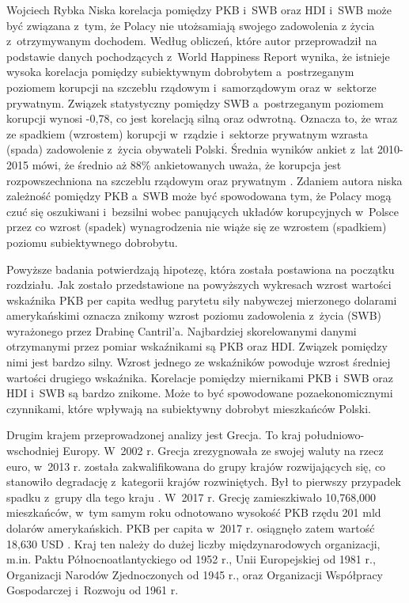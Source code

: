 \begin{artplenv}{Wojciech Rybka}
Niska korelacja pomiędzy PKB i~SWB oraz HDI i~SWB może być związana z~tym, że Polacy nie utożsamiają swojego zadowolenia
z życia z~otrzymywanym dochodem. Według obliczeń, które autor przeprowadził na podstawie danych pochodzących z~World
Happiness Report wynika, że istnieje wysoka korelacja pomiędzy subiektywnym dobrobytem a~postrzeganym poziomem korupcji
na szczeblu rządowym i~samorządowym oraz w~sektorze prywatnym. Związek statystyczny pomiędzy SWB a~postrzeganym
poziomem korupcji wynosi -0,78, co jest korelacją silną oraz odwrotną. Oznacza to, że wraz ze spadkiem (wzrostem)
korupcji w~rządzie i~sektorze prywatnym wzrasta (spada) zadowolenie z~życia obywateli Polski. Średnia wyników
ankiet z~lat 2010-2015 mówi, że średnio aż 88\% ankietowanych uważa, że korupcja jest rozpowszechniona na szczeblu rządowym oraz
prywatnym
\parencite{noauthor_world_2018}.
Zdaniem autora niska zależność pomiędzy PKB a~SWB
może być spowodowana tym, że Polacy mogą czuć się oszukiwani i~bezsilni wobec panujących układów korupcyjnych w~Polsce
przez co wzrost (spadek) wynagrodzenia nie wiąże się ze wzrostem (spadkiem) poziomu subiektywnego dobrobytu.

Powyższe badania potwierdzają hipotezę, która została postawiona na początku rozdziału. Jak zostało przedstawione na
powyższych wykresach wzrost wartości wskaźnika PKB per capita według parytetu siły nabywczej mierzonego dolarami
amerykańskimi oznacza znikomy wzrost poziomu zadowolenia z~życia (SWB) wyrażonego przez Drabinę Cantril’a. Najbardziej
skorelowanymi danymi otrzymanymi przez pomiar wskaźnikami są PKB oraz HDI. Związek pomiędzy nimi jest bardzo silny.
Wzrost jednego ze wskaźników powoduje wzrost średniej wartości drugiego wskaźnika. Korelacje pomiędzy miernikami
PKB i~SWB oraz HDI i~SWB są bardzo znikome. Może to być spowodowane pozaekonomicznymi czynnikami, które wpływają na
subiektywny dobrobyt mieszkańców Polski.

Drugim krajem przeprowadzonej analizy jest Grecja. To kraj południowo-wschodniej Europy. W~2002 r. Grecja
zrezygnowała ze swojej waluty na rzecz euro, w~2013 r. została zakwalifikowana do grupy krajów rozwijających się, co
stanowiło degradację z~kategorii krajów rozwiniętych. Był to pierwszy przypadek spadku z~grupy dla tego kraju
\parencite{international_monetary_fund_world_2019a}.
W~2017 r. Grecję zamieszkiwało 10,768,000 mieszkańców,
w~tym samym roku odnotowano wysokość PKB rzędu 201 mld dolarów amerykańskich. PKB per capita w~2017 r. osiągnęło zatem
wartość 18,630 USD
\parencite{international_monetary_fund_world_2019b}.
Kraj ten należy do dużej liczby
międzynarodowych organizacji, m.in. Paktu Północnoatlantyckiego od 1952 r., Unii Europejskiej od 1981 r., Organizacji
Narodów Zjednoczonych od 1945 r., oraz Organizacji Współpracy Gospodarczej i~Rozwoju od 1961 r. 


\end{artplenv}
